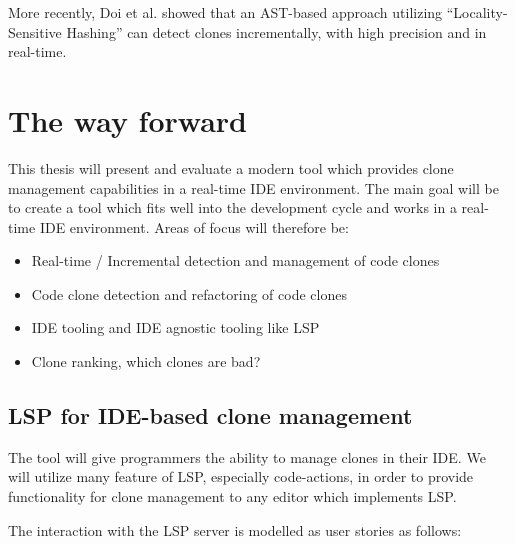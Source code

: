 \documentclass[12pt]{article}
\begin{document}
More recently, Doi et al.\cite{TowardsScalableAndIncrementalCloneDetection} showed that an
AST-based approach utilizing ``Locality-Sensitive Hashing'' can detect clones
incrementally, with high precision and in real-time.

\section{The way forward}

This thesis will present and evaluate a modern tool which provides clone management
capabilities in a real-time IDE environment. The main goal will be to create a tool which
fits well into the development cycle and works in a real-time IDE environment. Areas of
focus will therefore be:

\begin{itemize}
	\item Real-time / Incremental detection and management of code clones
	\item Code clone detection and refactoring of code clones
	\item IDE tooling and IDE agnostic tooling like LSP
	\item Clone ranking, which clones are bad?
\end{itemize}

\subsection{LSP for IDE-based clone management}

The tool will give programmers the ability to manage clones in their IDE. We will utilize
many feature of LSP, especially code-actions, in order to provide functionality for clone
management to any editor which implements LSP.

The interaction with the LSP server is modelled as user stories as follows:
\end{document}
